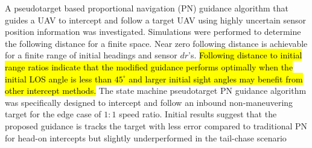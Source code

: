 \documentclass[conference]{IEEEtran}
\begin{document}


A pseudotarget based proportional navigation (PN) guidance algorithm that guides a UAV to intercept and follow a target UAV using highly uncertain sensor position information was investigated. Simulations were performed to determine the following distance for a finite space. Near zero following distance is achievable for a finite range of initial headings and sensor $dr$'s. \hl{Following distance to initial range ratios indicate that the modified guidance performs optimally when the initial LOS angle is less than $45^\circ$ and larger initial sight angles may benefit from other intercept methods.} The state machine pseudotarget PN guidance algorithm was specifically designed to intercept and follow an inbound non-maneuvering target for the edge case of $1:1$ speed ratio. Initial results suggest that the proposed guidance is tracks the target with less error compared to traditional PN for head-on intercepts but slightly underperformed in the tail-chase scenario 




\end{document}
